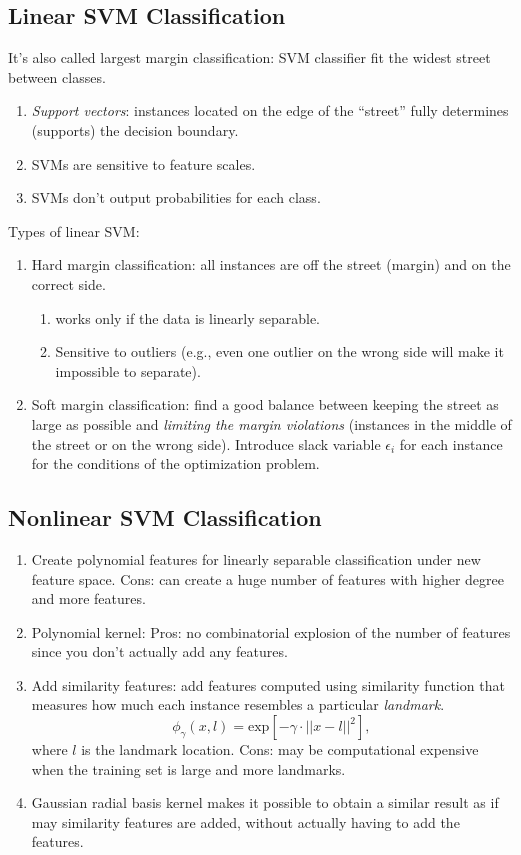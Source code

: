 \documentclass[12pt,oneside,a4paper]{article}
\numberwithin{equation}{section}
\begin{document}
\subsection{Linear SVM Classification}
It's also called largest margin classification: SVM classifier fit the widest street between classes.

\begin{enumerate}
\item \emph{Support vectors}: instances located on the edge of the ``street'' fully determines (supports) the decision boundary. 
\item SVMs are sensitive to feature scales. 
\item SVMs don't output probabilities for each class.
\end{enumerate}
Types of linear SVM:
\begin{enumerate}
\item Hard margin classification: all instances are off the street (margin) and on the correct side. 
\begin{enumerate}
\item works only if the data is linearly separable.
\item Sensitive to outliers (e.g., even one outlier on the wrong side will make it impossible to separate). 
\end{enumerate}

\item Soft margin classification: find a good balance between keeping the street as large as possible and \emph{limiting the margin violations} (instances in the middle of the street or on the wrong side). Introduce slack variable $\epsilon_i$ for each instance for the conditions of the optimization problem.
\end{enumerate}
\subsection{Nonlinear SVM Classification}

\begin{enumerate}
\item Create polynomial features for linearly separable classification under new feature space. Cons: can create a huge number of features with higher degree and more features. 
\item Polynomial kernel:  Pros: no combinatorial explosion of the number of features since you don't actually add any features.

\item Add similarity features: add features computed using similarity function that measures how much each instance resembles a particular \emph{landmark}.
\begin{equation}
\phi_\gamma (x, l) = \textrm{exp}\left[-\gamma \cdot ||x - l||^2\right],
\end{equation}
where $l$ is the landmark location. Cons: may be computational expensive when the training set is large and more landmarks.

\item Gaussian radial basis kernel makes it possible to obtain a similar result as if may similarity features are added, without actually having to add the features. 
\end{enumerate}
\end{document}
